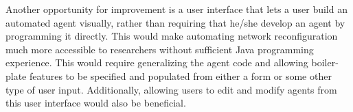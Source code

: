 Another opportunity for improvement is a user interface that lets a user build an automated agent visually, rather than requiring that he/she develop an agent by programming it directly. This would make automating network reconfiguration much more accessible to researchers without sufficient Java programming experience. This would require generalizing the agent code and allowing boiler-plate features to be specified and populated from either a form or some other type of user input. Additionally, allowing users to edit and modify agents from this user interface would also be beneficial.